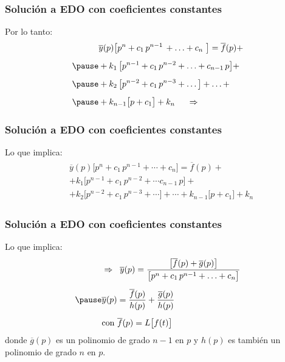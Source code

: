 \begin{frame}
\frametitle{Solución a EDO con coeficientes constantes}
Por lo tanto:
\pause
\begin{eqnarray*}
\begin{aligned}
&\overline{y}(p) \big[ p^{n} + c_{1} \, p^{n-1} \, + \ldots + c_{n}  \big] = \overline{f}(p) + \\[0.5em] \pause
&+ k_{1} \, \big[ p^{n-1} + c_{1} \, p^{n-2} + \ldots + c_{n-1} \, p \big] + \\[0.5em] \pause
&+ k_{2} \, \big[ p^{n-2} + c_{1} \, p^{n-3} + \ldots  \big] +  \ldots + \\[0.5em] \pause
&+ k_{n-1} \big[ p + c_{1}  \big] + k_{n} \hspace{0.5cm} \Rightarrow
\end{aligned}
\end{eqnarray*}
\end{frame}
\begin{frame}
\frametitle{Solución a EDO con coeficientes constantes}
Lo que implica:
\begin{eqnarray*}
\begin{aligned}
&\overline{y}(p) \big[ p^{n} + c_{1} \, p^{n-1} + \cdots + c_{n}  \big] = \overline{f}(p) + \\[0.5em] 
&+ k_{1} \big[ p^{n-1} + c_{1} \, p^{n-2} + \cdots c_{n-1} \, p \big] + \\[0.5em]
&+ k_{2} \big[ p^{n-2} + c_{1} \, p^{n-3} + \cdots \big] + \cdots + k_{n-1} \big[  p + c_{1} \big] + k_{n} 
\end{aligned}
\end{eqnarray*}
\end{frame}
\begin{frame}
\frametitle{Solución a EDO con coeficientes constantes}
Lo que implica:
\begin{eqnarray}
\begin{aligned}
&\Rightarrow \hspace{0.2cm} \overline{y}(p) = \dfrac{\big[ \overline{f}(p) + \overline{g}(p)  \big]}{\big[ p^{n}+ c_{1} \, p^{n-1} + \ldots + c_{n} \big]} \\[0.5em] \pause
&\overline{y}(p) = \dfrac{\overline{f}(p)}{h(p)} + \dfrac{\overline{g}(p)}{h(p)} \\[0.5em]
&\mbox{con } \overline{f} (p) = L \big[ f (t) \big]
\end{aligned}
\label{eq:ecuacion_04_55}
\end{eqnarray}
donde $\overline{g}(p)$ es un polinomio de grado $n-1$ en $p$ y $h(p)$ es también un polinomio de grado $n$ en $p$.
\end{frame}
